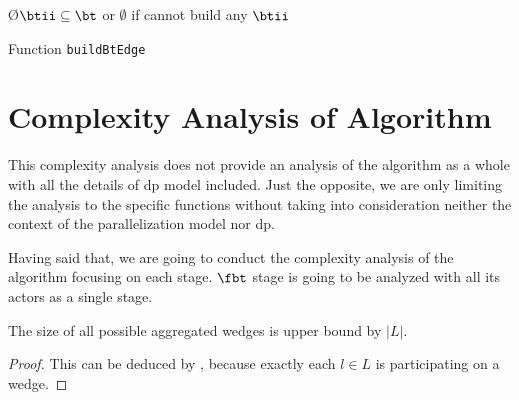 \begin{algorithm}
\SetAlgoRefName{[A10]}
\O{$\btii \subseteq \bt$ or $\emptyset$ if cannot build any $\btii$}
\caption{Function \texttt{buildBtEdge}}
\label{algo:buildBtEdge}
\end{algorithm}

\clearpage
\section{Complexity Analysis of Algorithm}
This complexity analysis does not provide an analysis of the algorithm as a whole with all the details of \acrshort{dp} model included.
Just the opposite, we are only limiting the analysis to the specific functions without taking into consideration neither the context of the parallelization model nor \acrshort{dp}.

Having said that, we are going to conduct the complexity analysis of the algorithm focusing on each stage. 
$\fbt$ stage is going to be analyzed with all its actors as a single stage.

\begin{theorem}[$|\aw| \leq |L|$]\label{theorem:awg}
The size of all possible aggregated wedges is upper bound by $|L|$.
\end{theorem}
\begin{proof}
This can be deduced by , because exactly each $l \in L$ is participating on a wedge.
\end{proof}


